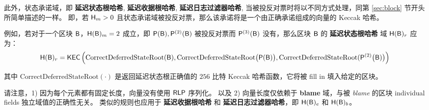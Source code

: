 	此外，状态承诺域，即 {\bf 延迟状态根哈希}, {\bf 延迟收据根哈希}, {\bf 延迟日志过滤器哈希},
	当被投反对票时将以不同方式处理，同第 \ref{sec:block} 节开头所简单描述的一样。
	即，若 $\textsf{H}_m>0$ 且状态承诺域被投反对票，那么该承诺将是一个由正确承诺组成的向量的 Keccak 哈希。
	
	例如，若对于一个区块 $\textsf{B}$，$\textsf{H}(\textsf{B})_m=2$ 成立，即 $\mathsf{P}(\textsf{B}),\mathsf{P}^{(2)}(\textsf{B})$ 被投反对票而 $\mathsf{P}^{(3)}(\textsf{B})$ 没有，那么区块 $\textsf{B}$ 的 {\bf 延迟状态根哈希} 域 $\textsf{H}(\textsf{B})_r$ 应为：
	\begin{align}
		\textsf{H}(\textsf{B})_r = \mathsf{KEC}\left( \mathrm{CorrectDeferredStateRoot}(\textsf{B}), \mathrm{CorrectDeferredStateRoot}\big(\mathsf{P}(\textsf{B})\big), \mathrm{CorrectDeferredStateRoot}(\mathsf{P}^{(2)}\big(\textsf{B})\big) \right)
	\end{align}
	
	其中 $\mathrm{CorrectDeferredStateRoot}(\cdot)$ 是返回延迟状态根正确值的 $256$ 比特 Keccak 哈希函数，它将被
	fill in
	填入给定的区块。
	
	请注意，1) 因为每个元素都有固定长度，向量没有使用 $\mathsf{RLP}$ 序列化。 
	以及 2) 向量长度仅依赖于 {\bf blame} 域，与被 \emph{blame} 的区块
	individual fields
	独立域值的正确性无关。
	类似的规则也应用于 {\bf 延迟收据根哈希} 和 {\bf 延迟日志过滤器哈希}，即 $\textsf{H}(\textsf{B})_e$ 和 $\textsf{H}(\textsf{B})_b$。

